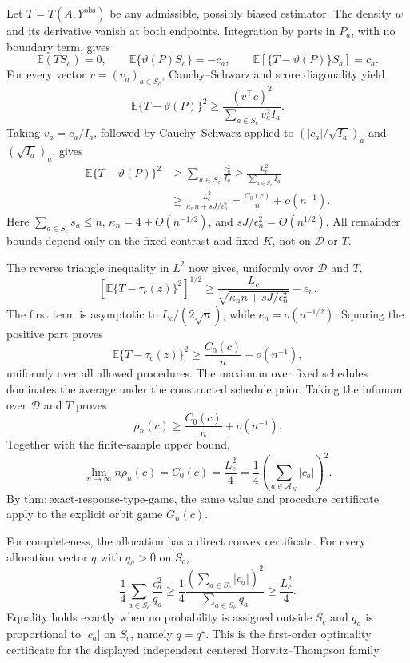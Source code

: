 Let \(T=T(A,Y^{\mathrm{obs}})\) be any admissible, possibly biased estimator.  The density \(w\) and its derivative vanish at both endpoints.  Integration by parts in \(P_a\), with no boundary term, gives
\[
 \mathbb E(TS_a)=0,
 \qquad
 \mathbb E\{\vartheta(P)S_a\}=-c_a,
 \qquad
 \mathbb E[\{T-\vartheta(P)\}S_a]=c_a.
\]
For every vector \(v=(v_a)_{a\in S_c}\), Cauchy--Schwarz and score diagonality yield
\[
 \mathbb E\{T-\vartheta(P)\}^2
 \geq\frac{(v^\top c)^2}{\sum_{a\in S_c}v_a^2I_a}.
\]
Taking \(v_a=c_a/I_a\), followed by Cauchy--Schwarz applied to
\((|c_a|/\sqrt{I_a})_a\) and \((\sqrt{I_a})_a\), gives
\[
 \begin{aligned}
 \mathbb E\{T-\vartheta(P)\}^2
 &\geq\sum_{a\in S_c}\frac{c_a^2}{I_a}
 \geq\frac{L_c^2}{\sum_{a\in S_c}I_a}\\
 &\geq\frac{L_c^2}{\kappa_n n+sJ/\epsilon_n^2}
 =\frac{C_0(c)}n+o(n^{-1}).
 \end{aligned}
\]
Here \(\sum_{a\in S_c}s_a\leq n\), \(\kappa_n=4+O(n^{-1/2})\), and \(sJ/\epsilon_n^2=O(n^{1/2})\).  All remainder bounds depend only on the fixed contrast and fixed \(K\), not on \(\mathcal D\) or \(T\).

The reverse triangle inequality in \(L^2\) now gives, uniformly over \(\mathcal D\) and \(T\),
\[
 \left[\mathbb E\{T-\tau_c(z)\}^2\right]^{1/2}
 \geq
 \frac{L_c}{\sqrt{\kappa_n n+sJ/\epsilon_n^2}}-e_n.
\]
The first term is asymptotic to \(L_c/(2\sqrt n)\), while \(e_n=o(n^{-1/2})\).  Squaring the positive part proves
\[
 \mathbb E\{T-\tau_c(z)\}^2
 \geq\frac{C_0(c)}n+o(n^{-1}),
\]
uniformly over all allowed procedures.  The maximum over fixed schedules dominates the average under the constructed schedule prior.  Taking the infimum over \(\mathcal D\) and \(T\) proves
\[
 \rho_n(c)\geq\frac{C_0(c)}n+o(n^{-1}).
\]
Together with the finite-sample upper bound,
\[
 \lim_{n\to\infty}n\rho_n(c)
 =C_0(c)=\frac{L_c^2}{4}
 =\frac14\left(\sum_{a\in\mathcal A_K}|c_a|\right)^2.
\]
By \(\mathrm{thm:exact\text{-}response\text{-}type\text{-}game}\), the same value and procedure certificate apply to the explicit orbit game \(G_n(c)\).

For completeness, the allocation has a direct convex certificate.  For every allocation vector \(q\) with \(q_a>0\) on \(S_c\),
\[
 \frac14\sum_{a\in S_c}\frac{c_a^2}{q_a}
 \geq\frac14\frac{\left(\sum_{a\in S_c}|c_a|\right)^2}
 {\sum_{a\in S_c}q_a}
 \geq\frac{L_c^2}{4}.
\]
Equality holds exactly when no probability is assigned outside \(S_c\) and \(q_a\) is proportional to \(|c_a|\) on \(S_c\), namely \(q=q^\star\).  This is the first-order optimality certificate for the displayed independent centered Horvitz--Thompson family.

